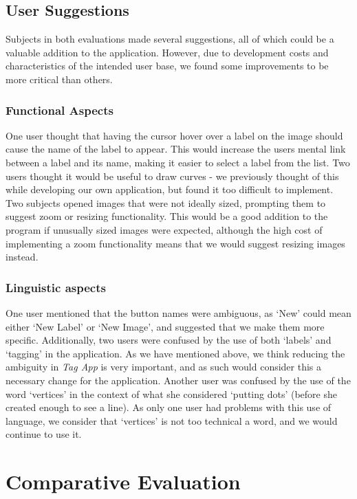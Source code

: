 \documentclass[11pt,twocolumn]{article}
\begin{document}
\subsection{User Suggestions}

Subjects in both evaluations made several suggestions, all of which could be a
valuable addition to the application. However, due to development costs and
characteristics of the intended user base, we found some improvements to be
more critical than others.

\subsubsection{Functional Aspects}

One user thought that having the cursor hover over a label on the image should
cause the name of the label to appear. This would increase the users mental
link between a label and its name, making it easier to select a label from the
list. Two users thought it would be useful to draw curves - we previously
thought of this while developing our own application, but found it too
difficult to implement. Two subjects opened images that were not ideally sized,
prompting them to suggest zoom or resizing functionality. This would be a good
addition to the program if unusually sized images were expected, although the
high cost of implementing a zoom functionality means that we would suggest
resizing images instead.

\subsubsection{Linguistic aspects}

One user mentioned that the button names were ambiguous, as `New' could mean
either `New Label' or `New Image', and suggested that we make them more
specific. Additionally, two users were confused by the use of both `labels' and
`tagging' in the application. As we have mentioned above, we think reducing the
ambiguity in \emph{Tag App} is very important, and as such would consider this a
necessary change for the application. Another user was confused by the use of
the word `vertices' in the context of what she considered `putting dots'
(before she created enough to see a line). As only one user had problems with
this use of language, we consider that `vertices' is not too technical a word,
and we would continue to use it.

\section{Comparative Evaluation}
\end{document}
